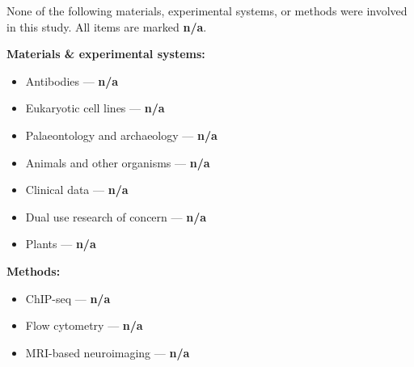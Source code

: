 \documentclass[11pt]{article}
\begin{document}
\noindent None of the following materials, experimental systems, or methods were involved in this study. All items are marked \textbf{n/a}.

\medskip
\noindent\textbf{Materials \& experimental systems:}

\begin{itemize}[noitemsep,leftmargin=2em]
\item[$\square$] Antibodies --- \textbf{n/a}
\item[$\square$] Eukaryotic cell lines --- \textbf{n/a}
\item[$\square$] Palaeontology and archaeology --- \textbf{n/a}
\item[$\square$] Animals and other organisms --- \textbf{n/a}
\item[$\square$] Clinical data --- \textbf{n/a}
\item[$\square$] Dual use research of concern --- \textbf{n/a}
\item[$\square$] Plants --- \textbf{n/a}
\end{itemize}

\medskip
\noindent\textbf{Methods:}

\begin{itemize}[noitemsep,leftmargin=2em]
\item[$\square$] ChIP-seq --- \textbf{n/a}
\item[$\square$] Flow cytometry --- \textbf{n/a}
\item[$\square$] MRI-based neuroimaging --- \textbf{n/a}
\end{itemize}
\end{document}
